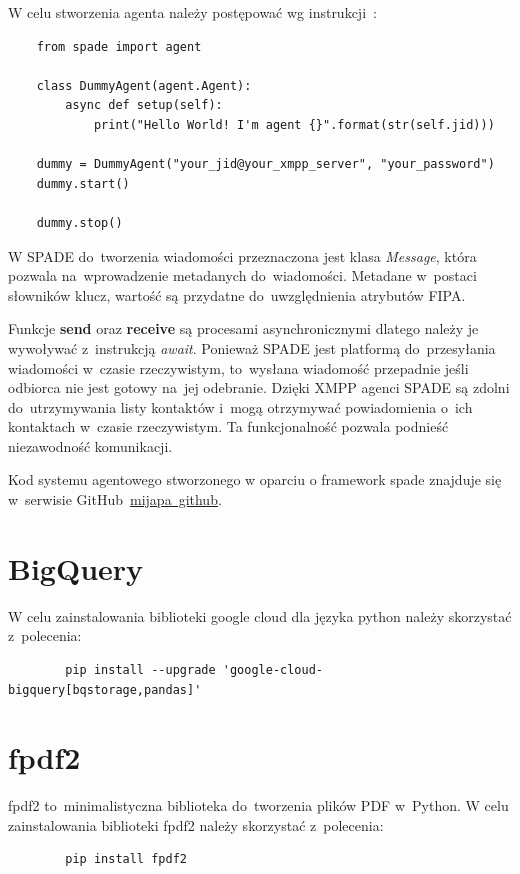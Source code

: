 \documentclass[11pt]{report}
\begin{document}
    W celu stworzenia agenta należy postępować wg instrukcji~\cite{SPADEquickstart}:
    \begin{verbatim}
    from spade import agent

    class DummyAgent(agent.Agent):
        async def setup(self):
            print("Hello World! I'm agent {}".format(str(self.jid)))

    dummy = DummyAgent("your_jid@your_xmpp_server", "your_password")
    dummy.start()

    dummy.stop()
    \end{verbatim}

    W SPADE do~tworzenia wiadomości przeznaczona jest klasa \textit{Message},
    która pozwala na~wprowadzenie metadanych do~wiadomości.
    Metadane w~postaci słowników klucz, wartość są przydatne do~uwzględnienia atrybutów FIPA\@.

    Funkcje \textbf{send} oraz \textbf{receive} są procesami asynchronicznymi dlatego należy je wywoływać z~instrukcją \textit{await}.
    Ponieważ SPADE jest platformą do~przesyłania wiadomości w~czasie rzeczywistym,
    to~wysłana wiadomość przepadnie jeśli odbiorca nie jest gotowy na~jej odebranie.
    Dzięki XMPP agenci SPADE są zdolni do~utrzymywania listy kontaktów i~mogą otrzymywać powiadomienia o~ich kontaktach w~czasie rzeczywistym.
    Ta funkcjonalność pozwala podnieść niezawodność komunikacji.

    Kod systemu agentowego stworzonego w oparciu o framework spade znajduje się w~serwisie GitHub~\href{https://github.com/mijapa/Praca_dyplomowa}{mijapa~github}.


    \section{BigQuery}
    W celu zainstalowania biblioteki google cloud dla języka python należy skorzystać z~polecenia:
    \begin{verbatim}
        pip install --upgrade 'google-cloud-bigquery[bqstorage,pandas]'
    \end{verbatim}


    \section{fpdf2}
    fpdf2 to~minimalistyczna biblioteka do~tworzenia plików PDF w~Python.
    W celu zainstalowania biblioteki fpdf2 należy skorzystać z~polecenia:
    \begin{verbatim}
        pip install fpdf2
    \end{verbatim}
\end{document}

